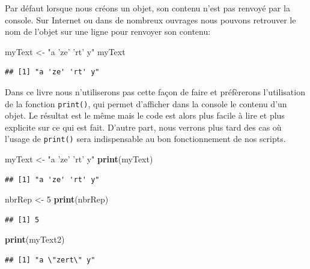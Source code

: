 \documentclass[
]{book}
\newenvironment{Shaded}{\begin{snugshade}}{\end{snugshade}}
\newcommand{\DecValTok}[1]{\textcolor[rgb]{0.00,0.00,0.81}{#1}}
\newcommand{\KeywordTok}[1]{\textcolor[rgb]{0.13,0.29,0.53}{\textbf{#1}}}
\newcommand{\NormalTok}[1]{#1}
\newcommand{\StringTok}[1]{\textcolor[rgb]{0.31,0.60,0.02}{#1}}
\begin{document}
Par défaut lorsque nous créons un objet, son contenu n'est pas renvoyé par la console. Sur Internet ou dans de nombreux ouvrages nous pouvons retrouver le nom de l'objet sur une ligne pour renvoyer son contenu:

\begin{Shaded}
\begin{Highlighting}[]
\NormalTok{myText <-}\StringTok{ "a 'ze' 'rt' y"}
\NormalTok{myText}
\end{Highlighting}
\end{Shaded}

\begin{verbatim}
## [1] "a 'ze' 'rt' y"
\end{verbatim}

Dans ce livre nous n'utiliserons pas cette façon de faire et préfèrerons l'utilisation de la fonction \texttt{print()}, qui permet d'afficher dans la console le contenu d'un objet. Le résultat est le même mais le code est alors plus facile à lire et plus explicite sur ce qui est fait. D'autre part, nous verrons plus tard des cas où l'usage de \texttt{print()} sera indispensable au bon fonctionnement de nos scripts.

\begin{Shaded}
\begin{Highlighting}[]
\NormalTok{myText <-}\StringTok{ "a 'ze' 'rt' y"}
\KeywordTok{print}\NormalTok{(myText)}
\end{Highlighting}
\end{Shaded}

\begin{verbatim}
## [1] "a 'ze' 'rt' y"
\end{verbatim}

\begin{Shaded}
\begin{Highlighting}[]
\NormalTok{nbrRep <-}\StringTok{ }\DecValTok{5}
\KeywordTok{print}\NormalTok{(nbrRep)}
\end{Highlighting}
\end{Shaded}

\begin{verbatim}
## [1] 5
\end{verbatim}

\begin{Shaded}
\begin{Highlighting}[]
\KeywordTok{print}\NormalTok{(myText2)}
\end{Highlighting}
\end{Shaded}

\begin{verbatim}
## [1] "a \"zert\" y"
\end{verbatim}
\end{document}
